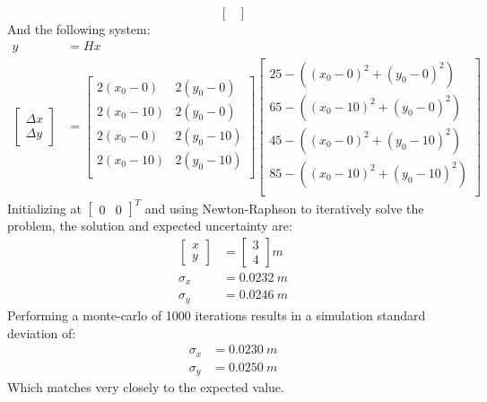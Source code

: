 \documentclass[11pt]{article}
\begin{document}
\begin{enumerate}[label=\textbf{\arabic*.}]
\begin{equation*}
\begin{bmatrix}
    \end{bmatrix}
  \end{equation*}
  And the following system:
  \begin{equation*}
    \begin{split}
      y &= Hx \\
      \begin{bmatrix}
        \Delta x \\ \Delta y
      \end{bmatrix}
      &=
      \begin{bmatrix}
        2(x_0 - 0) & 2(y_0 - 0) \\
        2(x_0 - 10) & 2(y_0 - 0) \\
        2(x_0 - 0) & 2(y_0 - 10) \\
        2(x_0 - 10) & 2(y_0 - 10) \\
      \end{bmatrix}
      \begin{bmatrix}
        25 - ((x_0 - 0)^2 + (y_0 - 0)^2) \\
        65 - ((x_0 - 10)^2 + (y_0 - 0)^2) \\
        45 - ((x_0 - 0)^2 + (y_0 - 10)^2) \\
        85 - ((x_0 - 10)^2 + (y_0 - 10)^2) \\
      \end{bmatrix}
    \end{split}
  \end{equation*}
  Initializing at $\begin{bmatrix} 0 & 0 \end{bmatrix}^T$ and using Newton-Raphson 
  to iteratively solve the problem, the solution and expected uncertainty are:
  \begin{equation*}
    \begin{split}
      \begin{bmatrix}
        x \\ y
      \end{bmatrix}
      &=
      \begin{bmatrix}
        3 \\ 4
      \end{bmatrix}
      \si{m}
      \\
      \sigma_x &= 0.0232 \:\si{m}\\
      \sigma_y &= 0.0246 \:\si{m}
    \end{split}
  \end{equation*}
  Performing a monte-carlo of 1000 iterations results in a simulation standard 
  deviation of:
  \begin{equation*}
    \begin{split}
      \sigma_x &= 0.0230 \:\si{m}\\
      \sigma_y &= 0.0250 \:\si{m}
    \end{split}
  \end{equation*}
  Which matches very closely to the expected value.


\end{enumerate}
\end{document}
